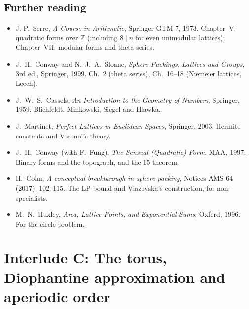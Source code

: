\documentclass[11pt,openany]{book}
\theoremstyle{plain}
\theoremstyle{definition}
\theoremstyle{remark}
\newcommand{\Z}{\mathbb{Z}}
\begin{document}
\section*{Further reading}
\begin{itemize}[nosep]
\item J.-P.~Serre, \emph{A Course in Arithmetic}, Springer GTM 7, 1973. Chapter~V: quadratic forms over $\Z$
  (including $8\mid n$ for even unimodular lattices); Chapter~VII: modular forms and theta series.
\item J.~H.~Conway and N.~J.~A.~Sloane, \emph{Sphere Packings, Lattices and Groups}, 3rd ed., Springer, 1999.
  Ch.~2 (theta series), Ch.~16--18 (Niemeier lattices, Leech).
\item J.~W.~S.~Cassels, \emph{An Introduction to the Geometry of Numbers}, Springer, 1959. Blichfeldt,
  Minkowski, Siegel and Hlawka.
\item J.~Martinet, \emph{Perfect Lattices in Euclidean Spaces}, Springer, 2003. Hermite constants and Voronoi's theory.
\item J.~H.~Conway (with F.~Fung), \emph{The Sensual (Quadratic) Form}, MAA, 1997. Binary forms
  and the topograph, and the 15 theorem.
\item H.~Cohn, \emph{A conceptual breakthrough in sphere packing}, Notices AMS 64 (2017), 102--115. The LP
  bound and Viazovska's construction, for non-specialists.
\item M.~N.~Huxley, \emph{Area, Lattice Points, and Exponential Sums}, Oxford, 1996. For the circle problem.
\end{itemize}
\endgroup
\begingroup\renewcommand{\thechapter}{C}\renewcommand{\theHchapter}{interludeC}


\chapter[Interlude C: Torus and aperiodic order]{Interlude C: The torus, Diophantine approximation and aperiodic order}
\label{ERG:ch}
\end{document}
